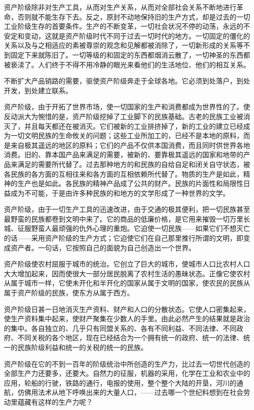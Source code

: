     资产阶级除非对生产工具，从而对生产关系，从而对全部社会关系不断地进行革命，否则就不能生存下去。反之，原封不动地保持旧的生产方式，却是过去的一切工业阶级生存的首要条件。生产的不断变革，一切社会状况不停的动荡，永远的不安定和变动，这就是资产阶级时代不同于过去一切时代的地方。一切固定的僵化的关系以及与之相适应的素被尊崇的观念和见解都被消除了，一切新形成的关系等不到固定下来就陈旧了。一切等级的和固定的东西都烟消云散了，一切神圣的东西都被亵渎了。人们终于不得不用冷静的眼光来看他们的生活地位、他们的相互关系。

    不断扩大产品销路的需要，驱使资产阶级奔走于全球各地。它必须到处落户，到处开发，到处建立联系。

    资产阶级，由于开拓了世界市场，使一切国家的生产和消费都成为世界性的了。使反动派大为惋惜的是，资产阶级挖掉了工业脚下的民族基础。古老的民族工业被消灭了，并且每天都还在被消灭。它们被新的工业排挤掉了，新的工业的建立已经成为一切文明民族的生命攸关的问题；这些工业所加工的，已经不是本地的原料，而是来自极其遥远的地区的原料；它们的产品不仅供本国消费，而且同时供世界各地消费。旧的、靠本国产品来满足的需要，被新的、要靠极其遥远的国家和地带的产品来满足的需要所代替了。过去那种地方的和民族的自给自足和闭关自守状态，被各民族的各方面的互相往来和各方面的互相依赖所代替了。物质的生产是如此，精神的生产也是如此。各民族的精神产品成了公共的财产。民族的片面性和局限性日益成为不可能，于是由许多种民族的和地方的文学形成了一种世界的文学。

    资产阶级，由于一切生产工具的迅速改进，由于交通的极其便利，把一切民族甚至最野蛮的民族都卷到文明中来了。它的商品的低廉价格，是它用来摧毁一切万里长城、征服野蛮人最顽强的仇外心理的重炮。它迫使一切民族——如果它们不想灭亡的话——采用资产阶级的生产方式；它迫使它们在自己那里推行所谓的文明，即变成资产者。一句话，它按照自己的面貌为自己创造出一个世界。

    资产阶级使农村屈服于城市的统治。它创立了巨大的城市，使城市人口比农村人口大大增加起来，因而使很大一部分居民脱离了农村生活的愚昧状态。正像它使农村从属于城市一样，它使未开化和半开化的国家从属于文明的国家，使农民的民族从属于资产阶级的民族，使东方从属于西方。

    资产阶级日甚一日地消灭生产资料、财产和人口的分散状态。它使人口密集起来，使生产资料集中起来，使财产聚集在少数人的手里。由此必然产生的结果就是政治的集中。各自独立的、几乎只有同盟关系的、各有不同利益、不同法律、不同政府、不同关税的各个地区，现在已经结合为一个拥有统一的政府、统一的法律、统一的民族阶级利益和统一的关税的统一的民族。

    资产阶级在它的不到一百年的阶级统治中所创造的生产力，比过去一切世代创造的全部生产力还要多，还要大。自然力的征服，机器的采用，化学在工业和农业中的应用，轮船的行驶，铁路的通行，电报的使用，整个整个大陆的开垦，河川的通航，仿佛用法术从地下呼唤出来的大量人口，——过去哪一个世纪料想到在社会劳动里蕴藏有这样的生产力呢？

